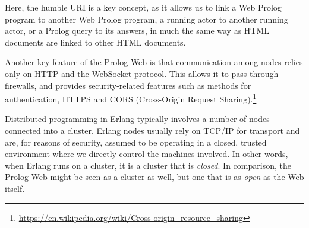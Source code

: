 \documentclass{tlp}
\begin{document}
Here, the humble URI is a key concept, as it allows us to link a Web Prolog program to another Web Prolog program, a running actor to another running actor, or a Prolog query to its answers, in much the same way as HTML documents are linked to other HTML documents.

Another key feature of the Prolog Web is that communication among nodes relies only on HTTP and the WebSocket protocol. This allows it to pass through firewalls, and provides security-related features such as methods for authentication, HTTPS and CORS (Cross-Origin Request Sharing).\footnote{\url{https://en.wikipedia.org/wiki/Cross-origin_resource_sharing}}

Distributed programming in Erlang typically involves a number of nodes connected into a cluster. Erlang nodes usually rely on TCP/IP for transport and are, for reasons of security, assumed to be operating in a closed, trusted environment where we directly control the machines involved. In other words, when Erlang runs on a cluster, it is a cluster that is \textit{closed}. In comparison, the Prolog Web might be seen as a cluster as well, but one that is as \textit{open} as the Web itself. %

\end{document}
